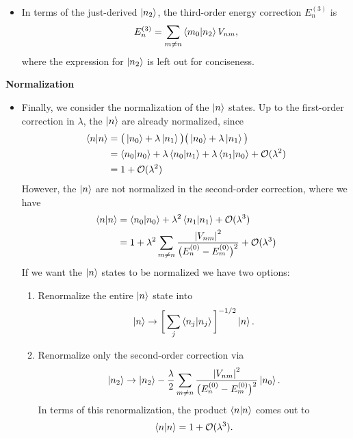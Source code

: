 \documentclass[11pt, a4paper]{article}
\begin{document}
\begin{itemize}
    \item In terms of the just-derived $ \ket{n_{2}} $, the third-order energy correction $ E_{n}^{(3)} $ is
    \begin{equation*}
        E_{n}^{(3)} = \sum_{m \neq n} \braket{m_{0}}{n_{2}} V_{nm},
    \end{equation*}
    where the expression for $ \ket{n_{2}} $ is left out for conciseness.
    
\end{itemize}

\textbf{Normalization}
\begin{itemize} 
    \item Finally, we consider the normalization of the $ \ket{n} $ states. Up to the first-order correction in $ \lambda $, the $ \ket{n} $ are already normalized, since
    \begin{align*}
        \braket{n}{n} &= \big( \ket{n_{0}} + \lambda \ket{n_{1}} \big)\big( \ket{n_{0}} + \lambda \ket{n_{1}} \big)\\
        &= \braket{n_{0}}{n_{0}} + \lambda \braket{n_{0}}{n_{1}} + \lambda \braket{n_{1}}{n_{0}} + \mathcal{O}(\lambda^{2})\\
        & = 1 + \mathcal{O}(\lambda^{2})
    \end{align*}
    However, the $ \ket{n} $ are not normalized in the second-order correction, where we have
    \begin{align*}
        \braket{n}{n} &= \braket{n_{0}}{n_{0}} + \lambda^{2} \braket{n_{1}}{n_{1}} + \mathcal{O}(\lambda^{3})\\
        & = 1 + \lambda^{2} \sum_{m \neq n} \frac{\abs{V_{nm}}^{2}}{\big( E_{n}^{(0)} - E_{m}^{(0)} \big)^{2}} + \mathcal{O}(\lambda^{3})
    \end{align*}
    If we want the $ \ket{n} $ states to be normalized we have two options:
    \begin{enumerate}
        \item Renormalize the entire $ \ket{n} $ state into
        \begin{equation*}
           \ket{n} \to \bigg[ \sum_{j} \braket{n_{j}}{n_{j}} \bigg]^{-1/2} \ket{n}.
        \end{equation*}
        
        \item Renormalize only the second-order correction via
        \begin{equation*}
            \ket{n_{2}} \to \ket{n_{2}} - \frac{\lambda}{2} \sum_{m \neq n} \frac{\abs{V_{nm}}^{2}}{\big( E_{n}^{(0)} - E_{m}^{(0)} \big)^{2}}\ket{n_{0}}.
        \end{equation*}
        In terms of this renormalization, the product $ \braket{n}{n} $ comes out to
        \begin{equation*}
            \braket{n}{n} = 1 + \mathcal{O}(\lambda^{3}).
        \end{equation*}
        
    \end{enumerate}
    
\end{itemize}
\end{document}
